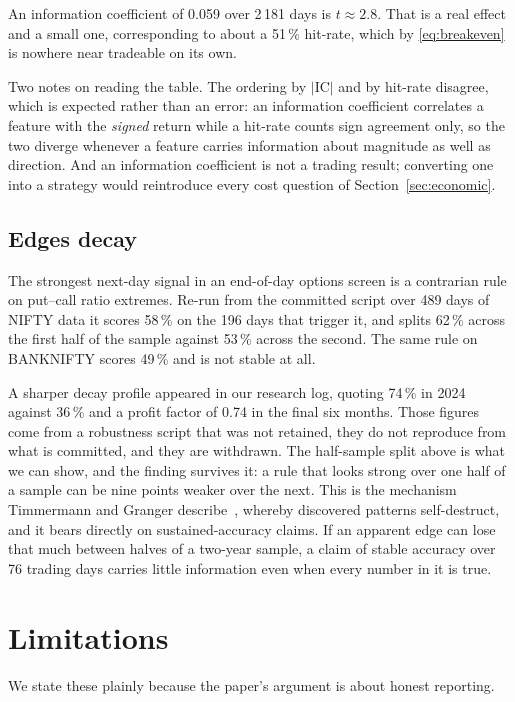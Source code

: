 \documentclass[conference]{IEEEtran}
\begin{document}
An information coefficient of 0.059 over 2\,181 days is $t \approx 2.8$. That is
a real effect and a small one, corresponding to about a 51\,\% hit-rate, which
by \eqref{eq:breakeven} is nowhere near tradeable on its own.

Two notes on reading the table. The ordering by $|\text{IC}|$ and by hit-rate
disagree, which is expected rather than an error: an information coefficient
correlates a feature with the \emph{signed} return while a hit-rate counts sign
agreement only, so the two diverge whenever a feature carries information about
magnitude as well as direction. And an information coefficient is not a trading
result; converting one into a strategy would reintroduce every cost question of
Section~\ref{sec:economic}.

\subsection{Edges decay}

The strongest next-day signal in an end-of-day options screen is a contrarian
rule on put--call ratio extremes. Re-run from the committed script over 489 days
of NIFTY data it scores 58\,\% on the 196 days that trigger it, and splits
62\,\% across the first half of the sample against 53\,\% across the second. The
same rule on BANKNIFTY scores 49\,\% and is not stable at all.

A sharper decay profile appeared in our research log, quoting 74\,\% in 2024
against 36\,\% and a profit factor of 0.74 in the final six months. Those figures
come from a robustness script that was not retained, they do not reproduce from
what is committed, and they are withdrawn. The half-sample split above is what
we can show, and the finding survives it: a rule that looks strong over one half
of a sample can be nine points weaker over the next. This is the mechanism
Timmermann and Granger describe~\cite{timmermann2004}, whereby discovered
patterns self-destruct, and it bears directly on sustained-accuracy claims. If
an apparent edge can lose that much between halves of a two-year sample, a claim
of stable accuracy over 76 trading days carries little information even when
every number in it is true.

\section{Limitations}

We state these plainly because the paper's argument is about honest reporting.
\end{document}
